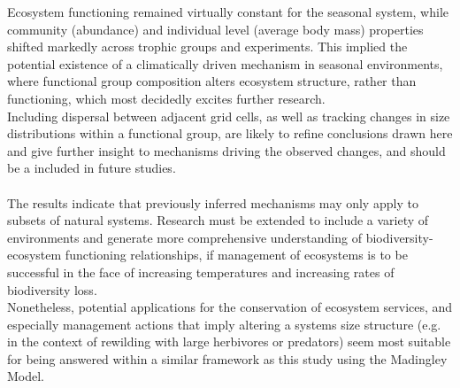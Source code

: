 Ecosystem functioning remained virtually constant for the seasonal system, while community (abundance) and individual level (average body mass) properties shifted markedly across trophic groups and experiments. This implied the potential existence of a climatically driven mechanism in seasonal environments, where functional group composition alters ecosystem structure, rather than functioning, which most decidedly excites further research.
 \\
Including dispersal between adjacent grid cells, as well as tracking changes in size distributions within a functional group, are likely to refine conclusions drawn here and give further insight to mechanisms driving the observed changes, and should be a included in future studies. 
\\\\
The results indicate that previously inferred mechanisms may only apply to subsets of natural systems. Research must be extended to include a variety of environments and generate more comprehensive understanding of biodiversity-ecosystem functioning relationships, if management of ecosystems is to be successful in the face of increasing temperatures and increasing rates of biodiversity loss. 
\\
Nonetheless,  potential applications for the conservation of ecosystem services, and especially management actions that imply altering a systems size structure (e.g. in the context of rewilding with large herbivores or predators) seem most suitable for being answered within a similar framework as this study using the Madingley Model.
\\\\
